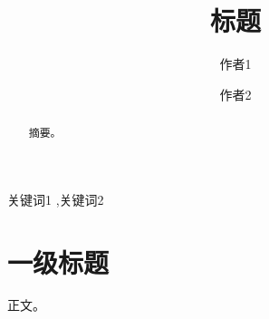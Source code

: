\documentclass[preprint,3p]{elsarticle}
\begin{document}
\begin{frontmatter}  %

\title{标题}

\author{作者1}
\author{作者2}

\begin{abstract}
摘要。
\end{abstract}

\begin{keyword}
关键词1 \sep 关键词2
\end{keyword}

\end{frontmatter}

\section{一级标题}

正文。





\newpage
\appendix
\end{document}
